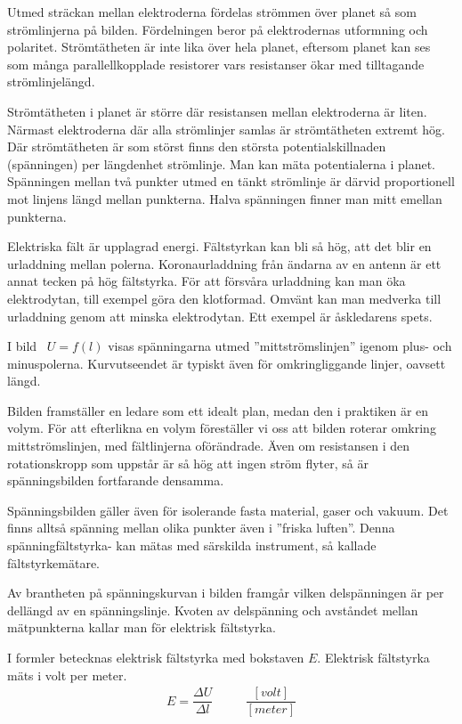 Utmed sträckan mellan elektroderna fördelas strömmen över planet så som
strömlinjerna på bilden.
Fördelningen beror på elektrodernas utformning och polaritet.
Strömtätheten är inte lika över hela planet, eftersom planet kan ses som många
parallellkopplade resistorer vars resistanser ökar med tilltagande
strömlinjelängd.

Strömtätheten i planet är större där resistansen mellan elektroderna är liten.
Närmast elektroderna där alla strömlinjer samlas är strömtätheten extremt hög.
Där strömtätheten är som störst finns den största potentialskillnaden
(spänningen) per längdenhet strömlinje.
Man kan mäta potentialerna i planet.
Spänningen mellan två punkter utmed en tänkt strömlinje är därvid proportionell
mot linjens längd mellan punkterna.
Halva spänningen finner man mitt emellan punkterna.

Elektriska fält är upplagrad energi.
Fältstyrkan kan bli så hög, att det blir en urladdning mellan polerna.
Koronaurladdning från ändarna av en antenn är ett annat tecken på hög
fältstyrka.
För att försvåra urladdning kan man öka elektrodytan, till exempel göra den
klotformad.
Omvänt kan man medverka till urladdning genom att minska elektrodytan.
Ett exempel är åskledarens spets.

I bild~ \(U = f(l)\) visas spänningarna utmed
''mittströmslinjen'' igenom plus- och minuspolerna.
Kurvutseendet är typiskt även för omkringliggande linjer, oavsett längd.

Bilden framställer en ledare som ett idealt plan, medan den i praktiken är en
volym.
För att efterlikna en volym föreställer vi oss att bilden roterar omkring
mittströmslinjen, med fältlinjerna oförändrade.
Även om resistansen i den rotationskropp som uppstår är så hög att ingen ström
flyter, så är spänningsbilden fortfarande densamma.

Spänningsbilden gäller även för isolerande fasta material, gaser och vakuum.
Det finns alltså spänning mellan olika punkter även i ''friska luften''.
Denna spänningfältstyrka- kan mätas med särskilda instrument, så kallade
fältstyrkemätare.

\newpage
Av brantheten på spänningskurvan i bilden framgår vilken delspänningen är per
dellängd av en spänningslinje.
Kvoten av delspänning och avståndet mellan mätpunkterna kallar man för
elektrisk fältstyrka.

I formler betecknas elektrisk fältstyrka med bokstaven \(E\).
Elektrisk fältstyrka mäts i volt per meter.
\[
\begin{array}{ccc}
E=\dfrac{\Delta U}{\Delta l} &\quad& \dfrac{[volt]}{[meter]}
\end{array}
\]
